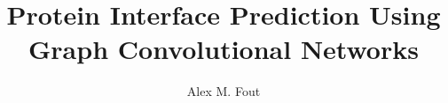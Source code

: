 \documentclass[master]{thesis}
\title{Protein Interface Prediction Using Graph Convolutional Networks}
\author{Alex M. Fout}
\begin{document}

\frontmatter %

\maketitle
\makemycopyright
\makeabstract
\makeacknowledgements


\tableofcontents
\listoftables %
\listoffigures %

\mainmatter %





















\backmatter %




\appendix %








\end{document}

